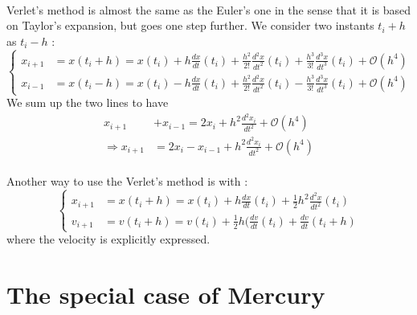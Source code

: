 \documentclass[a4paper, twoside, 11pt]{report}
\theoremstyle{theorem}
\theoremstyle{remark}
\theoremstyle{exemple}
\begin{document}
            \paragraph{}Verlet's method is almost the same as the Euler's one in the sense that it is based on Taylor's expansion, but goes one step further. We consider two instants $t_i+h$ as $t_i-h$ :
                \begin{equation*}
                    \left\{ 
                        \begin{aligned}
                            x_{i+1} &= x(t_i+h) = x(t_i) + h\frac{dx}{dt}(t_i) + \frac{h^2}{2!}\frac{d^2x}{dt^2}(t_i) + \frac{h^3}{3!}\frac{d^3x}{dt^3}(t_i)+\mathcal{O}(h^4)\\
                            x_{i-1} &= x(t_i-h) = x(t_i) - h\frac{dx}{dt}(t_i) + \frac{h^2}{2!}\frac{d^2x}{dt^2}(t_i) - \frac{h^3}{3!}\frac{d^3x}{dt^3}(t_i)+\mathcal{O}(h^4)
                        \end{aligned}
                    \right.
                \end{equation*}
            We sum up the two lines to have
                \begin{align*}
                    x_{i+1} &+ x_{i-1} = 2x_i + h^2\frac{d^2x_i}{dt^2} + \mathcal{O}(h^4) \\
                    \Rightarrow x_{i+1} &= 2x_i - x_{i-1} + h^2\frac{d^2x_i}{dt^2} + \mathcal{O}(h^4)
                \end{align*}
            \paragraph{}Another way to use the Verlet's method is with :
                \begin{equation*}
                    \left\{
                        \begin{aligned}
                            x_{i+1}&=x(t_i+h) = x(t_i) + h\frac{dx}{dt}(t_i) + \frac{1}{2}h^2 \frac{d^2x}{dt^2}(t_i)\\
                            v_{i+1}&=v(t_i+h) = v(t_i) + \frac{1}{2}h(\frac{dv}{dt}(t_i) + \frac{dv}{dt}(t_i+h)
                        \end{aligned}
                    \right.
                \end{equation*}
            where the velocity is explicitly expressed.
            
        \section{The special case of Mercury}
\end{document}
